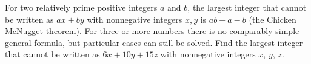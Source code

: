 For two relatively prime positive integers $a$ and $b$, the largest integer that cannot be written as $ax+by$ with nonnegative integers $x,y$ is $ab-a-b$ (the Chicken McNugget theorem). For three or more numbers there is no comparably simple general formula, but particular cases can still be solved. Find the largest integer that cannot be written as $6x+10y+15z$ with nonnegative integers $x$, $y$, $z$.

